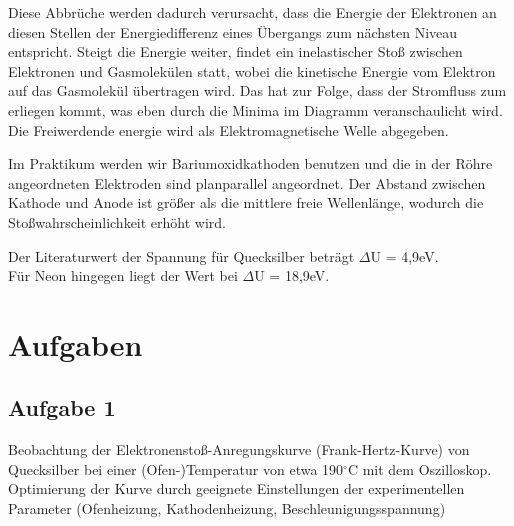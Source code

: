 \documentclass{article}
\begin{document}
{Diese Abbrüche werden dadurch verursacht, dass die Energie der Elektronen an diesen Stellen der Energiedifferenz eines Übergangs zum nächsten Niveau entspricht. Steigt die Energie weiter, findet ein inelastischer Stoß zwischen Elektronen und Gasmolekülen statt, wobei die kinetische Energie vom Elektron auf das Gasmolekül übertragen wird. Das hat zur Folge, dass der Stromfluss zum erliegen kommt, was eben durch die Minima im Diagramm veranschaulicht wird. Die Freiwerdende energie wird als Elektromagnetische Welle abgegeben.


Im Praktikum werden wir Bariumoxidkathoden benutzen und die in der Röhre angeordneten Elektroden sind planparallel angeordnet. Der Abstand zwischen Kathode und Anode ist größer als die mittlere freie Wellenlänge, wodurch die Stoßwahrscheinlichkeit erhöht wird.

{\begin{center}
\begin{minipage}{\linewidth}
\centering
{}
%
\label{verlauf}
\end{minipage}
\end{center}


Der Literaturwert der Spannung für Quecksilber beträgt \(\Delta\)U = 4,9eV.\\
Für Neon hingegen liegt der Wert bei \(\Delta\)U = 18,9eV.

\newpage
\section{Aufgaben}
\subsection*{Aufgabe 1}
Beobachtung der Elektronenstoß-Anregungskurve (Frank-Hertz-Kurve) von Quecksilber bei einer (Ofen-)Temperatur von etwa 190\(^\circ\)C mit dem Oszilloskop. Optimierung der Kurve durch geeignete Einstellungen der experimentellen Parameter (Ofenheizung, Kathodenheizung, Beschleunigungsspannung)

}}
\end{document}
